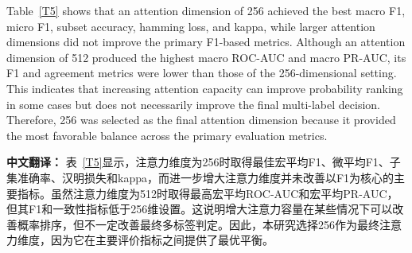 \documentclass[Afour,sagev,times]{sagej}
\begin{document}
\begin{table}[h]
\scriptsize\sf\centering
\caption{Sensitivity analysis of attention dimension.\label{T5}}
\end{table}

Table~\ref{T5} shows that an attention dimension of 256 achieved the best macro F1, micro F1, subset accuracy, hamming loss, and kappa, while larger attention dimensions did not improve the primary F1-based metrics. Although an attention dimension of 512 produced the highest macro ROC-AUC and macro PR-AUC, its F1 and agreement metrics were lower than those of the 256-dimensional setting. This indicates that increasing attention capacity can improve probability ranking in some cases but does not necessarily improve the final multi-label decision. Therefore, 256 was selected as the final attention dimension because it provided the most favorable balance across the primary evaluation metrics.

\textbf{中文翻译：} 表~\ref{T5}显示，注意力维度为256时取得最佳宏平均F1、微平均F1、子集准确率、汉明损失和kappa，而进一步增大注意力维度并未改善以F1为核心的主要指标。虽然注意力维度为512时取得最高宏平均ROC-AUC和宏平均PR-AUC，但其F1和一致性指标低于256维设置。这说明增大注意力容量在某些情况下可以改善概率排序，但不一定改善最终多标签判定。因此，本研究选择256作为最终注意力维度，因为它在主要评价指标之间提供了最优平衡。
\end{document}
